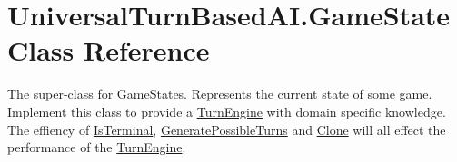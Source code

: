 \hypertarget{class_universal_turn_based_a_i_1_1_game_state}{}\section{Universal\+Turn\+Based\+A\+I.\+Game\+State Class Reference}
\label{class_universal_turn_based_a_i_1_1_game_state}


The super-\/class for Game\+States. Represents the current state of some game. Implement this class to provide a \hyperlink{class_universal_turn_based_a_i_1_1_turn_engine}{Turn\+Engine} with domain specific knowledge. The effiency of \hyperlink{class_universal_turn_based_a_i_1_1_game_state_a2d877d322bd57b7c6962d09b20baeebb}{Is\+Terminal}, \hyperlink{class_universal_turn_based_a_i_1_1_game_state_a252554bfd9fd58bdc06bd6f49b716240}{Generate\+Possible\+Turns} and \hyperlink{class_universal_turn_based_a_i_1_1_game_state_a7e9d117069df3da5b42eeadecf33a326}{Clone} will all effect the performance of the \hyperlink{class_universal_turn_based_a_i_1_1_turn_engine}{Turn\+Engine}.  


